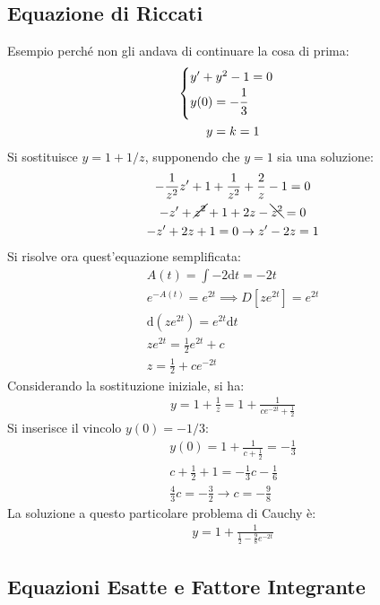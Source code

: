 \documentclass{article}
\newcommand{\df}{\mathrm{d}}
\numberwithin{equation}{subsection}
\begin{document}
\subsection{Equazione di Riccati}

Esempio perché non gli andava di continuare la cosa di prima:
\begin{gather*}
    \begin{cases}
        y'+y^2-1=0\\
        y(0)=-\displaystyle\frac{\strut 1}{\strut3}
    \end{cases}\\
    y=k=1
\end{gather*}
Si sostituisce $y=1+1/z$, supponendo che $y=1$ sia una soluzione:
\begin{gather*}
    \displaystyle-\frac{1}{z^2}z'+1+\frac{1}{z^2}+\frac{2}{z}-1=0\\
    -z'+\cancel{z^2}+1+2z-\bcancel{z^2}=0\\
    -z'+2z+1=0\to z'-2z=1
\end{gather*}
Si risolve ora quest'equazione semplificata:
\begin{gather*}
    A(t)=\displaystyle\int-2\df t=-2t\\
    e^{-A(t)}=e^{2t}\implies D[ze^{2t}]=e^{2t}\\
    \df(ze^{2t})=e^{2t}\df t\\
    ze^{2t}=\frac{1}{2}e^{2t}+c\\
    z=\frac{1}{2}+ce^{-2t}
\end{gather*}
Considerando la sostituzione iniziale, si ha:
\begin{gather*}
    y=1+\frac{1}{z}=1+\frac{1}{ce^{-2t}+\frac{1}{2}}
\end{gather*}
Si inserisce il vincolo $y(0)=-1/3$:
\begin{gather*}
    y(0)=1+\frac{1}{c+\frac{1}{2}}=-\frac{1}{3}\\
    c+\frac{1}{2}+1=-\frac{1}{3}c-\frac{1}{6}\\
    \frac{4}{3}c=-\frac{3}{2}\to c=-\frac{9}{8}
\end{gather*}
La soluzione a questo particolare problema di Cauchy è:
\begin{gather*}
    y=1+\frac{1}{\frac{1}{2}-\frac{9}{8}e^{-2t}}
\end{gather*}

\subsection{Equazioni Esatte e Fattore Integrante}
\end{document}
